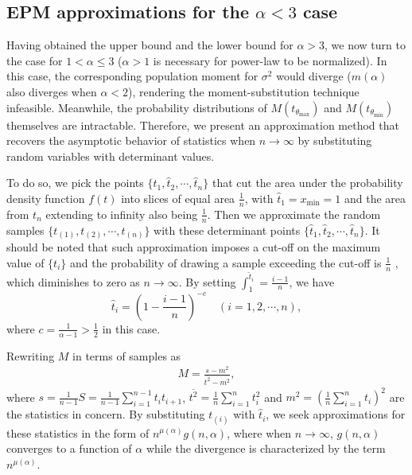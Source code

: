 \subsection{EPM approximations for the $ \alpha<3 $ case}
Having obtained the upper bound \label{eqs:max-mem-theory} and the lower bound\label{eqs:min-mem-theory} for $ \alpha>3 $, we now turn to the case for $ 1 < \alpha \leq 3 $ ($ \alpha > 1$ is necessary for power-law to be normalized). In this case, the corresponding population moment for $ \sigma^{2} $ would diverge ($ m(\alpha) $ also diverges when $ \alpha <2 $), rendering the moment-substitution technique infeasible. Meanwhile, the probability distributions of $ M(t_{\theta_{\max}}) $ and $ M(t_{\theta_{\min}}) $ themselves are intractable. Therefore, we present an approximation method that recovers the asymptotic behavior of statistics when $ n \rightarrow \infty $ by substituting random variables with determinant values. 

To do so, we pick the points $ \{\hat{t}_1, \hat{t}_2, \cdots, \hat{t}_n\} $ that cut the area under the probability density function $ f(t) $ into slices of equal area $ \frac{1}{n} $, with $ \hat{t}_1 = x_{\min} = 1 $ and the area from $ t_{n} $ extending to infinity also being $ \frac{1}{n} $. Then we approximate the random samples $ \{ t_{(1)}, t_{(2)}, \cdots, t_{(n)} \} $  with these determinant points $ \{ \hat{t}_1, \hat{t}_2, \cdots, \hat{t}_n \} $. It should be noted that such approximation imposes a cut-off on the maximum value of $ \{t_i\} $ and the probability of drawing a sample exceeding the cut-off is $ \frac{1}{n} $ , which diminishes to zero as $ n \rightarrow \infty $.    
By setting $ \int_{1}^{\hat{t}_i} = \frac{i-1}{n} $, we have
\begin{equation}
	\hat{t}_i = (1-\frac{i-1}{n})^{-c}  \quad (i=1,2,\cdots,n),
\end{equation}
where $ c = \frac{1}{\alpha-1} > \frac{1}{2} $ in this case. 

Rewriting $ M $ in terms of samples as
\begin{equation}
\begin{split}
	M = \frac{s-m^{2}}{\overline{t^{2}} -m^{2}},
\end{split}	
\end{equation} 
where $ s = \frac{1}{n-1} S = \frac{1}{n-1} \sum_{i=1}^{n-1} t_{i} t_{i+1}$, $ \overline{t^2} = \frac{1}{n} \sum_{i=1}^n t_i^2 $ and $ m^2 = (\frac{1}{n}\sum_{i=1}^n t_i)^2 $ are the statistics in concern. By substituting $t_{(i)}$ with $ \hat{t}_i $, we seek approximations for these statistics in the form of $ n^{\mu(\alpha)}g(n,\alpha) $, where when $ n \rightarrow \infty $, $ g(n,\alpha) $ converges to a function of $ \alpha $ while the divergence is characterized by the term $ n^{\mu(\alpha)} $.

